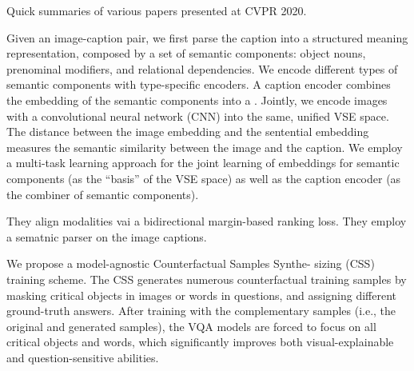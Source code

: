 \documentclass[11pt]{article}
\begin{document}

Quick summaries of various papers presented at CVPR 2020. 

\myspace
{}
\myspace
{}

\begin{myquote}
	Given an image-caption pair, we first parse the caption into a structured meaning representation, composed by a set of semantic components: object nouns, prenominal modifiers, and relational dependencies. We encode different types of semantic components with type-specific encoders. A caption encoder combines the embedding of the semantic components into a . Jointly, we encode images with a convolutional neural network (CNN) into the same, unified VSE space. The distance between the image embedding and the sentential embedding measures the semantic similarity between the image and the caption. We employ a multi-task learning approach for the joint learning of embeddings for semantic components (as the “basis” of the VSE space) as well as the caption encoder (as the combiner of semantic components). 
\end{myquote}


They align modalities vai a bidirectional margin-based ranking loss. They employ a sematnic parser on the image captions.\textit{}


\myspace
{}
\myspace


\begin{myquote}
	We propose a model-agnostic Counterfactual Samples Synthe- sizing (CSS) training scheme. The CSS generates numerous counterfactual training samples by masking critical objects in images or words in questions, and assigning different ground-truth answers. After training with the complementary samples (i.e., the original and generated samples), the VQA models are forced to focus on all critical objects and words, which significantly improves both visual-explainable and question-sensitive abilities.
\end{myquote}
\end{document}
